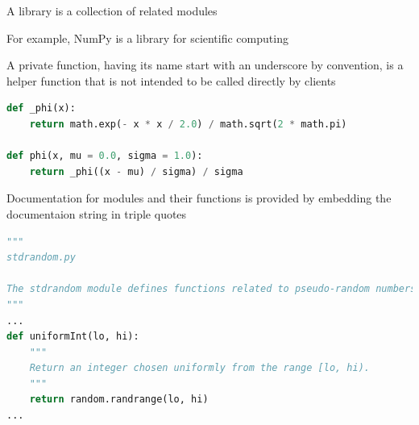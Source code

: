 \documentclass[8pt,a4paper,compress]{beamer}
\begin{document}
\begin{frame}[fragile]
\pause

A library is a collection of related modules

\pause
\bigskip

For example, NumPy is a library for scientific computing

\pause
\bigskip

A private function, having its name start with an underscore by convention, is a helper function that is not intended to be called directly by clients
\begin{lstlisting}[language=Python]
def _phi(x):
    return math.exp(- x * x / 2.0) / math.sqrt(2 * math.pi)
    
def phi(x, mu = 0.0, sigma = 1.0):
    return _phi((x - mu) / sigma) / sigma
\end{lstlisting}

\pause
\bigskip

Documentation for modules and their functions is provided by embedding the documentaion string in triple quotes
\begin{lstlisting}[language=Python]
"""
stdrandom.py

The stdrandom module defines functions related to pseudo-random numbers.
"""
...
def uniformInt(lo, hi):
    """
    Return an integer chosen uniformly from the range [lo, hi).
    """
    return random.randrange(lo, hi)
...
\end{lstlisting}
\end{frame}
\end{document}
